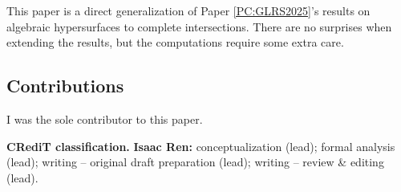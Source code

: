 This paper is a direct generalization of Paper \ref{PC:GLRS2025}'s results on algebraic hypersurfaces to complete intersections. There are no surprises when extending the results, but the computations require some extra care.

\subsection*{Contributions}

I was the sole contributor to this paper.

\textbf{\sffamily CRediT classification.} \textbf{Isaac Ren:} conceptualization (lead); formal analysis (lead); writing -- original draft preparation (lead); writing -- review \& editing (lead).

\let\sectionmark\oldsectionmark
\let\thesection\theoldsection